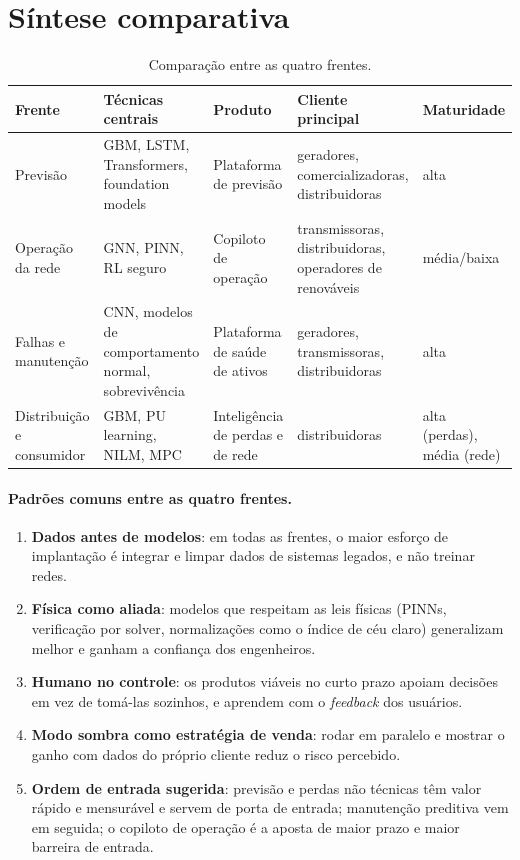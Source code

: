 \documentclass[10pt,a4paper,oneside]{article}
\begin{document}
\section{Síntese comparativa}

\begin{table}[h]
\small
\caption{Comparação entre as quatro frentes.}
\begin{tabelalarga}
\begin{tabularx}{\linewidth}{l L L L l}
\toprule
\textbf{Frente} & \textbf{Técnicas centrais} & \textbf{Produto} &
  \textbf{Cliente principal} & \textbf{Maturidade} \\
\midrule
Previsão & GBM, LSTM, Transformers, foundation models &
  Plataforma de previsão & geradores, comercializadoras, distribuidoras &
  alta \\
Operação da rede & GNN, PINN, RL seguro & Copiloto de operação &
  transmissoras, distribuidoras, operadores de renováveis & média/baixa \\
Falhas e manutenção & CNN, modelos de comportamento normal, sobrevivência &
  Plataforma de saúde de ativos & geradores, transmissoras, distribuidoras &
  alta \\
Distribuição e consumidor & GBM, PU learning, NILM, MPC &
  Inteligência de perdas e de rede & distribuidoras & alta (perdas),
  média (rede) \\
\bottomrule
\end{tabularx}
\end{tabelalarga}
\end{table}

\paragraph{Padrões comuns entre as quatro frentes.}
\begin{enumerate}
  \item \textbf{Dados antes de modelos}: em todas as frentes, o maior esforço
    de implantação é integrar e limpar dados de sistemas legados, e não
    treinar redes.
  \item \textbf{Física como aliada}: modelos que respeitam as leis físicas
    (PINNs, verificação por solver, normalizações como o índice de céu claro)
    generalizam melhor e ganham a confiança dos engenheiros.
  \item \textbf{Humano no controle}: os produtos viáveis no curto prazo apoiam
    decisões em vez de tomá-las sozinhos, e aprendem com o
    \textit{feedback} dos usuários.
  \item \textbf{Modo sombra como estratégia de venda}: rodar em paralelo e
    mostrar o ganho com dados do próprio cliente reduz o risco percebido.
  \item \textbf{Ordem de entrada sugerida}: previsão e perdas não técnicas têm
    valor rápido e mensurável e servem de porta de entrada; manutenção
    preditiva vem em seguida; o copiloto de operação é a aposta de maior
    prazo e maior barreira de entrada.
\end{enumerate}
\end{document}
